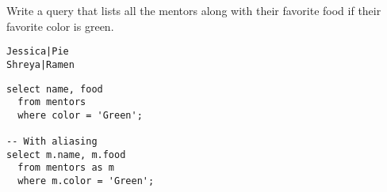 \begin{blocksection}
\question Write a query that lists all the mentors along with their favorite food if their favorite color is green.

\begin{lstlisting}
Jessica|Pie
Shreya|Ramen
\end{lstlisting}

\begin{solution}[1in]
\begin{lstlisting}
select name, food
  from mentors
  where color = 'Green';
  
-- With aliasing
select m.name, m.food
  from mentors as m
  where m.color = 'Green';
\end{lstlisting}
\end{solution}
\end{blocksection}
